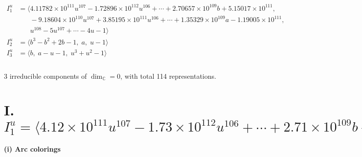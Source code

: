 \documentclass[1p]{elsarticle_modified}
\theoremstyle{definition}
\begin{document}
\begin{align*}
I^u_{1}&=\langle 
4.11782\times10^{111} u^{107}-1.72896\times10^{112} u^{106}+\cdots+2.70657\times10^{109} b+5.15017\times10^{111},\\
\phantom{I^u_{1}}&\phantom{= \langle  }-9.18604\times10^{110} u^{107}+3.85195\times10^{111} u^{106}+\cdots+1.35329\times10^{109} a-1.19005\times10^{111},\\
\phantom{I^u_{1}}&\phantom{= \langle  }u^{108}-5 u^{107}+\cdots-4 u-1\rangle \\
I^u_{2}&=\langle 
b^3- b^2+2 b-1,\;a,\;u-1\rangle \\
I^u_{3}&=\langle 
b,\;a- u-1,\;u^3+u^2-1\rangle \\
\\
\end{align*}
\raggedright * 3 irreducible components of $\dim_{\mathbb{C}}=0$, with total 114 representations.\\
\newpage
\renewcommand{\arraystretch}{1}
\centering \section*{I. $I^u_{1}= \langle 4.12\times10^{111} u^{107}-1.73\times10^{112} u^{106}+\cdots+2.71\times10^{109} b+5.15\times10^{111},\;-9.19\times10^{110} u^{107}+3.85\times10^{111} u^{106}+\cdots+1.35\times10^{109} a-1.19\times10^{111},\;u^{108}-5 u^{107}+\cdots-4 u-1 \rangle$}
\flushleft \textbf{(i) Arc colorings}\\
\end{document}
